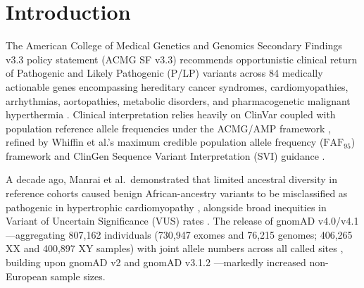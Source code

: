 \documentclass[11pt,letterpaper]{article}
\begin{document}
\begin{abstract}
\noindent\textbf{Conclusions:} Extending Johnston et al.'s (2026) DAFT baseline with live 2026 CSpec specifications, ploidy-correct chrX callability and hemizygote parsing, allele-exact QC auditing, and denominator-controlled ancestry modeling shows that high-confidence (2--4$\star$) AD P/LP assertions are far cleaner than naive audits imply. Clinical pipelines should prioritize (i) allele-exact joins with mandatory gnomAD filter gating and ploidy-aware chrX denominators, (ii) mode-of-inheritance tags in ClinVar VCF exports for dual-mode genes, and (iii) formal VCEP re-evaluation of the 327 CSpec-governed VUS frequency-conflict candidates heavily enriched in non-European ancestries.
\end{abstract}

\section{Introduction}
The American College of Medical Genetics and Genomics Secondary Findings v3.3 policy statement (ACMG SF v3.3) recommends opportunistic clinical return of Pathogenic and Likely Pathogenic (P/LP) variants across 84 medically actionable genes encompassing hereditary cancer syndromes, cardiomyopathies, arrhythmias, aortopathies, metabolic disorders, and pharmacogenetic malignant hyperthermia \citep{lee2025acmg,miller2023acmg}. Clinical interpretation relies heavily on ClinVar \citep{landrum2025clinvar} coupled with population reference allele frequencies under the ACMG/AMP framework \citep{richards2015standards}, refined by Whiffin et al.'s maximum credible population allele frequency ($\mathrm{FAF}_{95}$) framework \citep{whiffin2017frequency} and ClinGen Sequence Variant Interpretation (SVI) guidance \citep{ghosh2018ba1}.

A decade ago, Manrai et al.\ demonstrated that limited ancestral diversity in reference cohorts caused benign African-ancestry variants to be misclassified as pathogenic in hypertrophic cardiomyopathy \citep{manrai2016misdiagnoses}, alongside broad inequities in Variant of Uncertain Significance (VUS) rates \citep{popejoy2016diversity,caswelljin2018disparities}. The release of gnomAD v4.0/v4.1---aggregating 807,162 individuals (730,947 exomes and 76,215 genomes; 406,265 XX and 400,897 XY samples) with joint allele numbers across all called sites \citep{gnomadv41release2024,gnomadv41sex2024}, building upon gnomAD v2 \citep{karczewski2020gnomad} and gnomAD v3.1.2 \citep{chen2024gnomadv3}---markedly increased non-European sample sizes.
\end{document}
